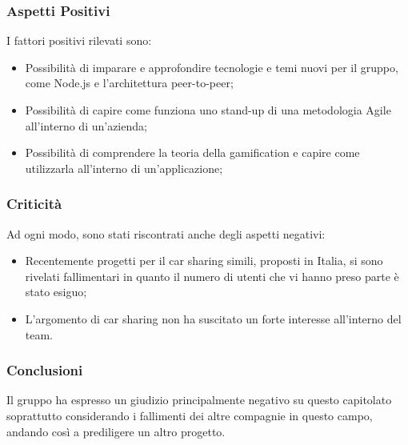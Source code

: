 \subsubsection{Aspetti Positivi}
I fattori positivi rilevati sono:
\begin{itemize}
	\item Possibilità di imparare e approfondire tecnologie e temi nuovi per il 
gruppo, come Node.js e l'architettura peer-to-peer;
	\item Possibilità di capire come funziona uno stand-up di una metodologia Agile 
all'interno di un'azienda;
	\item Possibilità di comprendere la teoria della gamification e capire come 
utilizzarla all'interno di un'applicazione;
\end{itemize}

\subsubsection{Criticità}
Ad ogni modo, sono stati riscontrati anche degli aspetti negativi:
\begin{itemize}
	\item Recentemente progetti per il car sharing simili, proposti in Italia, si 
sono rivelati fallimentari in quanto il numero di utenti che vi hanno preso 
parte è stato esiguo;

	\item L'argomento di car sharing non ha suscitato un forte interesse 
all'interno del team.
\end{itemize}
\subsubsection{Conclusioni}
Il gruppo ha espresso un giudizio principalmente negativo su questo capitolato 
soprattutto considerando i fallimenti dei altre compagnie in questo campo, 
andando così a prediligere un altro progetto.
